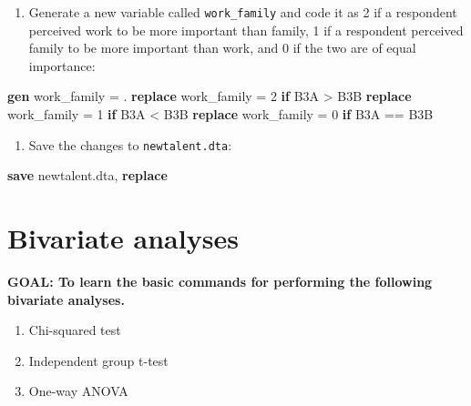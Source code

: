 \documentclass[
]{book}
\newenvironment{Shaded}{\begin{snugshade}}{\end{snugshade}}
\newcommand{\KeywordTok}[1]{\textcolor[rgb]{0.13,0.29,0.53}{\textbf{#1}}}
\newcommand{\NormalTok}[1]{#1}
\providecommand{\tightlist}{%
  \setlength{\itemsep}{0pt}\setlength{\parskip}{0pt}}
\begin{document}
\begin{alert}
\begin{enumerate}
\def\labelenumi{\arabic{enumi}.}
\setcounter{enumi}{6}
\tightlist
\item
  Generate a new variable called \texttt{work\_family} and code it as 2 if a respondent perceived work to be more important than family, 1 if a respondent perceived family to be more important than work, and 0 if the two are of equal importance:
\end{enumerate}

\begin{Shaded}
\begin{Highlighting}[]
\KeywordTok{gen}\NormalTok{ work\_family = .}
\KeywordTok{replace}\NormalTok{ work\_family = 2 }\KeywordTok{if}\NormalTok{ B3A \textgreater{} B3B}
\KeywordTok{replace}\NormalTok{ work\_family = 1 }\KeywordTok{if}\NormalTok{ B3A \textless{} B3B}
\KeywordTok{replace}\NormalTok{ work\_family = 0 }\KeywordTok{if}\NormalTok{ B3A == B3B}
\end{Highlighting}
\end{Shaded}

\begin{enumerate}
\def\labelenumi{\arabic{enumi}.}
\setcounter{enumi}{7}
\tightlist
\item
  Save the changes to \texttt{newtalent.dta}:
\end{enumerate}

\begin{Shaded}
\begin{Highlighting}[]
\KeywordTok{save}\NormalTok{ newtalent.dta, }\KeywordTok{replace} 
\end{Highlighting}
\end{Shaded}

\end{alert}

\hypertarget{bivariate-analyses}{%
\section{Bivariate analyses}\label{bivariate-analyses}}

\begin{alert}

\textbf{GOAL: To learn the basic commands for performing the following bivariate analyses.}

\begin{enumerate}
\def\labelenumi{\arabic{enumi}.}
\tightlist
\item
  Chi-squared test
\item
  Independent group t-test
\item
  One-way ANOVA
\end{enumerate}

\end{alert}
\end{document}
